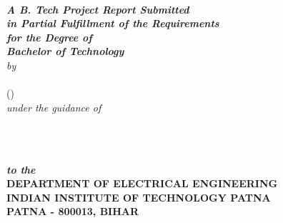 \begin{titlepage}
\begin{center}
\textheight 15.5in \textwidth 12.5in {\large\sf  \textbf{\the\btptitle}}\\[12ex]
{\small{\textsl{ \textbf{A B. Tech Project Report Submitted \\
in Partial Fulfillment of the Requirements \\
for the Degree of
\\[3ex]\small \bf Bachelor of Technology}}}}\\[16ex] \emph{by} \\[2ex]
{\sf \sf \textbf{\the\name}\\
             (\the\rollno)}\\[1ex]
\emph{under the guidance of}\\[2ex]
{\sf \bf \the\guide} \\[7ex]

\vspace{1in}

 \begin{figure}[!h]
 \hfill
  \hfill \
 \end{figure}

{\sl \bf{to the}} \\[1ex]

{\small\bf DEPARTMENT OF ELECTRICAL ENGINEERING}  \\[1ex]
{\small \bf{INDIAN INSTITUTE OF TECHNOLOGY PATNA \\PATNA - 800013,
BIHAR}}
%
\end{center}
\end{titlepage}
